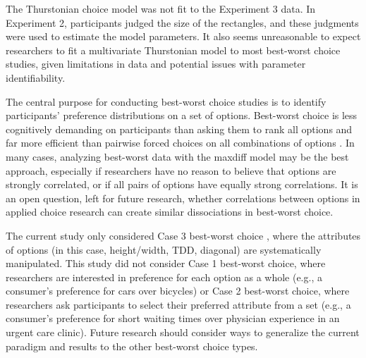 
The Thurstonian choice model was not fit to the Experiment 3 data. In Experiment 2, participants judged the size of the rectangles, and these judgments were used to estimate the model parameters. It also seems unreasonable to expect researchers to fit a multivariate Thurstonian model to most best-worst choice studies, given limitations in data and potential issues with parameter identifiability. 

The central purpose for conducting best-worst choice studies is to identify participants' preference distributions on a set of options. Best-worst choice is less cognitively demanding on participants than asking them to rank all options and far more efficient than pairwise forced choices on all combinations of options \parencite{louviere2008modeling}. In many cases, analyzing best-worst data with the maxdiff model may be the best approach, especially if researchers have no reason to believe that options are strongly correlated, or if all pairs of options have equally strong correlations. It is an open question, left for future research, whether correlations between options in applied choice research can create similar dissociations in best-worst choice. 

The current study only considered Case 3 best-worst choice \parencite{marleyModelsBestWorst2012}, where the attributes of options (in this case, height/width, TDD, diagonal) are systematically manipulated. This study did not consider Case 1 best-worst choice, where researchers are interested in preference for each option as a whole (e.g., a consumer's preference for cars over bicycles) or Case 2 best-worst choice, where researchers ask participants to select their preferred attribute from a set (e.g., a consumer's preference for short waiting times over physician experience in an urgent care clinic). Future research should consider ways to generalize the current paradigm and results to the other best-worst choice types.
